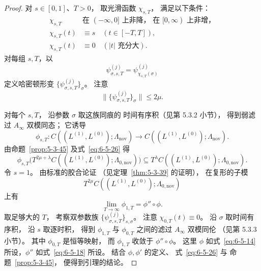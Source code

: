 \begin{proof}
对 $s\in[0,1]$、$T>0$，
取光滑函数 $\chi_{s,T}$，
满足以下条件：
\begin{align}
\chi_{s,T}
&\text{在 }(-\infty,0]\text{ 上非降，
在 }[0,\infty)\text{ 上非增，}
\tag{6.5.24.1}\label{eq:6-5-24-1}\\
\chi_{s,T}(t)&\equiv s
\quad(t\in[-T,T]),
\tag{6.5.24.2}\label{eq:6-5-24-2}\\
\chi_{s,T}(t)&\equiv0
\quad(|t|\text{ 充分大}).
\tag{6.5.24.3}\label{eq:6-5-24-3}
\end{align}
对每组 $s,T$，以
\begin{equation}
\psi_{\sigma,s,T}^{(j)}
=\psi_{\chi_{s,T}(\sigma)}^{(j)}
\tag{6.5.25}\label{eq:6-5-25}
\end{equation}
定义哈密顿形变
$\{\psi_{\sigma,s,T}^{(j)}\}_\sigma$。
注意
\begin{equation}
\bigl\|\{\psi_{\sigma,s,T}^{(j)}\}_\sigma\bigr\|
\le2\mu.
\tag{6.5.26}\label{eq:6-5-26}
\end{equation}

对每个 $s,T$，
沿参数 $\sigma$ 取这族同痕的
时间有序积（见第 5.3.2 小节），
得到弱滤过 $A_\infty$ 双模同态；
它诱导
\[
\phi_{s,T}:
C((L^{(1)},L^{(0)});\Lambda_{\mathrm{nov}})
\longrightarrow
C((L^{(1)},L^{(0)});\Lambda_{\mathrm{nov}}).
\]
由命题~\ref{prop:5-3-45}
及式~\eqref{eq:6-5-26} 得
\begin{equation}
\phi_{s,T}
\bigl(T^{2\mu+\lambda}
C((L^{(1)},L^{(0)});
\Lambda_{0,\mathrm{nov}})\bigr)
\subseteq
T^\lambda
C((L^{(1)},L^{(0)});
\Lambda_{0,\mathrm{nov}}).
\tag{6.5.27}\label{eq:6-5-27}
\end{equation}
令 $s=1$。
由标准的胶合论证
（见定理~\ref{thm:5-3-39} 的证明），
在复形的子模
\[
T^{2\mu}C((L^{(1)},L^{(0)});
\Lambda_{0,\mathrm{nov}})
\]
上有
\begin{equation}
\lim_{T\to\infty}\phi_{1,T}
=\phi''\circ\phi.
\tag{6.5.28}\label{eq:6-5-28}
\end{equation}
取足够大的 $T$，
考察双参数族
$\{\psi_{\sigma,s,T}^{(j)}\}_{s,\sigma}$。
注意 $\chi_{0,T}(t)\equiv0$。
沿 $\sigma$ 取时间有序积，
沿 $s$ 取逐时积，
得到 $\phi_{1,T}$ 与 $\phi_{0,T}$
之间的滤过 $A_\infty$ 双模同伦
（见第 5.3.3 小节）。
其中 $\phi_{0,T}$ 是恒等映射，
而 $\phi_{1,T}$ 收敛于
$\phi''\circ\phi$。
这里 $\phi$ 如式~\eqref{eq:6-5-14}
所设，$\phi''$ 如式~\eqref{eq:6-5-18}
所设。
结合 $\phi,\phi'$ 的定义、
式~\eqref{eq:6-5-26} 与
命题~\ref{prop:5-3-45}，
便得到引理的结论。
\end{proof}

